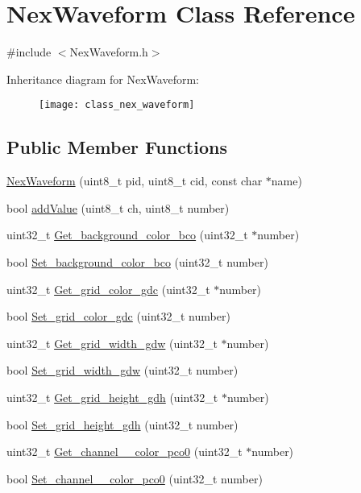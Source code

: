 \hypertarget{class_nex_waveform}{\section{Nex\+Waveform Class Reference}
\label{class_nex_waveform}
}


{\ttfamily \#include $<$Nex\+Waveform.\+h$>$}

Inheritance diagram for Nex\+Waveform\+:\begin{figure}[H]
\begin{center}
\leavevmode
\texttt{[image: class\_nex\_waveform]}
\end{center}
\end{figure}
\subsection*{Public Member Functions}
\begin{DoxyCompactItemize}
\item 
\hyperlink{class_nex_waveform_a4f18ca5050823e874d526141c8595514}{Nex\+Waveform} (uint8\+\_\+t pid, uint8\+\_\+t cid, const char $\ast$name)
\item 
bool \hyperlink{class_nex_waveform_a5b04ea7397b784947b845e2a03fc77e4}{add\+Value} (uint8\+\_\+t ch, uint8\+\_\+t number)
\item 
uint32\+\_\+t \hyperlink{class_nex_waveform_a66cec3c4d0d1a769dbf50c8092cc01d1}{Get\+\_\+background\+\_\+color\+\_\+bco} (uint32\+\_\+t $\ast$number)
\item 
bool \hyperlink{class_nex_waveform_aefec5eb25ee698c8c940c9190d60b696}{Set\+\_\+background\+\_\+color\+\_\+bco} (uint32\+\_\+t number)
\item 
uint32\+\_\+t \hyperlink{class_nex_waveform_ac5a6622e9004600f24b12e60ebb6b984}{Get\+\_\+grid\+\_\+color\+\_\+gdc} (uint32\+\_\+t $\ast$number)
\item 
bool \hyperlink{class_nex_waveform_ab396211f736824a0210446e68dc3edf4}{Set\+\_\+grid\+\_\+color\+\_\+gdc} (uint32\+\_\+t number)
\item 
uint32\+\_\+t \hyperlink{class_nex_waveform_ad5c4968c81d4941a08841cbaf217c631}{Get\+\_\+grid\+\_\+width\+\_\+gdw} (uint32\+\_\+t $\ast$number)
\item 
bool \hyperlink{class_nex_waveform_a41cb6d8b1ff6c309d1c4e8a1f73304fe}{Set\+\_\+grid\+\_\+width\+\_\+gdw} (uint32\+\_\+t number)
\item 
uint32\+\_\+t \hyperlink{class_nex_waveform_a87f6baf5a7a9c52f54281865e757d9a3}{Get\+\_\+grid\+\_\+height\+\_\+gdh} (uint32\+\_\+t $\ast$number)
\item 
bool \hyperlink{class_nex_waveform_a85e776a5347c22efd9abe9bb8cfdbddb}{Set\+\_\+grid\+\_\+height\+\_\+gdh} (uint32\+\_\+t number)
\item 
uint32\+\_\+t \hyperlink{class_nex_waveform_a09e36144f65c73b21edcfd5caff8a914}{Get\+\_\+channel\+\_\+\_\+color\+\_\+pco0} (uint32\+\_\+t $\ast$number)
\item 
bool \hyperlink{class_nex_waveform_ade323e0eae3b5058a76245e5ac97b037}{Set\+\_\+channel\+\_\+\_\+color\+\_\+pco0} (uint32\+\_\+t number)
\end{DoxyCompactItemize}
